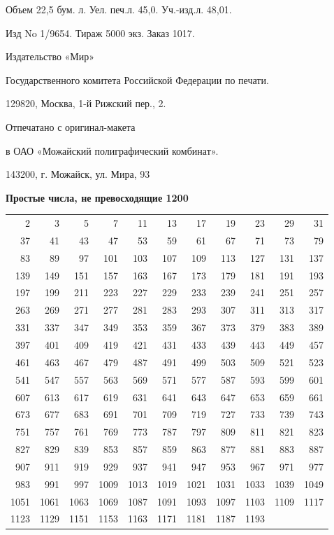 \documentclass{mai_book}
\begin{document}
{\begin{center}
 		Объем 22,5 бум. л. Уел. печ.л. 45,0. Уч.-изд.л. 48,01.
 		
 		 Изд No 1/9654. Тираж 5000 экз. Заказ 1017.
 	\end{center}
 
 \begin{center}
 	 		Издательство «Мир»
 	
 	Государственного комитета Российской Федерации по печати. 
 	
 	129820, Москва, 1-й Рижский пер., 2.
 	
 	Отпечатано с оригинал-макета
 	
 	в ОАО «Можайский полиграфический комбинат». 
 	
 	143200, г. Можайск, ул. Мира, 93
 	
 \end{center}

\newpage
 \thispagestyle{empty}
	\begin{center}
	{\large\textbf{Простые числа, не превосходящие 1200}}
\end{center}
	\begin{tabular}{rrrrrrrrrrr}
2 & 3 & 5 & 7 & 11 & 13	& 17 & 19 & 23 & 29 & 31 \\
37 & 41 & 43 & 47 & 53 & 59 & 61 & 67 & 71 & 73 & 79 \\
83 & 89 & 97 & 101 & 103 & 107 & 109 & 113 & 127 & 131 & 137 \\
139 & 149 & 151 & 157 & 163 & 167 & 173 & 179 & 181 & 191 & 193 \\	
197 & 199 & 211 & 223 & 227 & 229 & 233 & 239 & 241 & 251 & 257 \\ 
263 & 269 & 271 & 277 & 281 & 283 & 293 & 307 & 311 & 313 & 317 \\
331 & 337 & 347 & 349 & 353 & 359 & 367 & 373 & 379 & 383 & 389 \\
397 & 401 & 409 & 419 & 421 & 431 & 433 & 439 & 443 & 449 & 457 \\
461 & 463 & 467 & 479 & 487 & 491 & 499 & 503 & 509 & 521 & 523 \\
541 & 547 & 557 & 563 & 569 & 571 & 577 & 587 & 593 & 599 & 601 \\
607 & 613 & 617 & 619 & 631 & 641 & 643 & 647 & 653 & 659 & 661 \\
673 & 677 & 683 & 691 & 701 & 709 & 719 & 727 & 733 & 739 & 743 \\
751 & 757 & 761 & 769 & 773 & 787 & 797 & 809 & 811 & 821 & 823 \\
827 & 829 & 839 & 853 & 857 & 859 & 863 & 877 & 881 & 883 & 887 \\
907 & 911 & 919 & 929 & 937 & 941 & 947 & 953 & 967 & 971 & 977 \\
983 & 991 & 997 & 1009 & 1013 & 1019 & 1021 & 1031 & 1033 & 1039 & 1049 \\
1051 & 1061 & 1063 & 1069 & 1087 & 1091 & 1093 & 1097 & 1103 & 1109 & 1117 \\
1123 & 1129 & 1151 & 1153 & 1163 & 1171 & 1181 & 1187 & 1193 \\
	\end{tabular}

}
\end{document}

